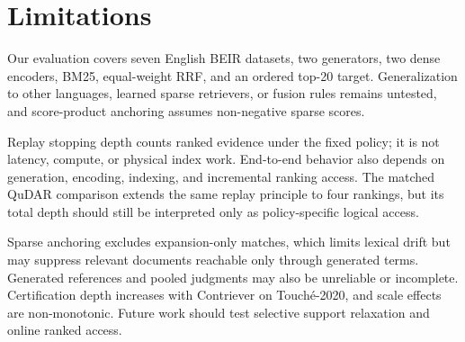 \section*{Limitations}

\label{limitations}

Our evaluation covers seven English BEIR datasets, two generators, two dense encoders, BM25, equal-weight RRF, and an ordered top-20 target. Generalization to other languages, learned sparse retrievers, or fusion rules remains untested, and score-product anchoring assumes non-negative sparse scores.

Replay stopping depth counts ranked evidence under the fixed policy; it is not latency, compute, or physical index work. End-to-end behavior also depends on generation, encoding, indexing, and incremental ranking access. The matched QuDAR comparison extends the same replay principle to four rankings, but its total depth should still be interpreted only as policy-specific logical access.

Sparse anchoring excludes expansion-only matches, which limits lexical drift but may suppress relevant documents reachable only through generated terms. Generated references and pooled judgments may also be unreliable or incomplete. Certification depth increases with Contriever on Touché-2020, and scale effects are non-monotonic. Future work should test selective support relaxation and online ranked access.
